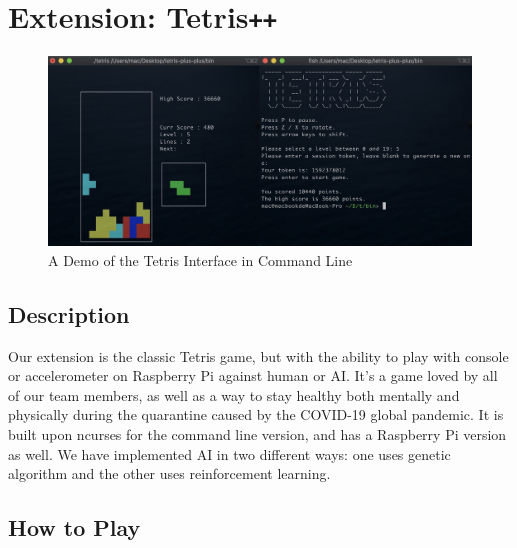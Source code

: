 \documentclass[11pt]{article}
\begin{document}

\section{Extension: Tetris\texttt{++}}

\begin{figure}[!ht]
  \centering
  \includegraphics[scale = 0.25]{tetris.jpg}
    \caption{A Demo of the Tetris Interface in Command Line}
  \label{part2:jpg}
\end{figure}



\subsection{Description}

\begin{flushleft}
Our extension is the classic Tetris game, but with the ability to play with console or accelerometer on Raspberry Pi against human or AI. It's a game loved by all of our team members, as well as a way to stay healthy both mentally and physically during the quarantine caused by the COVID-19 global pandemic. It is built upon ncurses for the command line version, and has a Raspberry Pi version as well. We have implemented AI in two different ways: one uses genetic algorithm and the other uses reinforcement learning.
\end{flushleft}


\subsection{How to Play}
\end{document}
